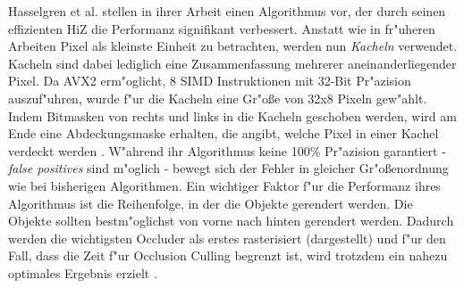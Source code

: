 \documentclass[journal]{vgtc}
\begin{document}
Hasselgren et al. \cite{MSOC} stellen in ihrer Arbeit einen Algorithmus vor, der durch seinen effizienten HiZ die Performanz signifikant verbessert. Anstatt wie in fr"uheren Arbeiten Pixel als kleinste Einheit zu betrachten, werden nun \textit{Kacheln} verwendet. Kacheln sind dabei lediglich eine Zusammenfassung mehrerer aneinanderliegender Pixel. Da AVX2 erm"oglicht, 8 SIMD Instruktionen mit 32-Bit Pr"azision auszuf"uhren, wurde f"ur die Kacheln eine Gr"o\ss{}e von 32x8 Pixeln gew"ahlt. Indem Bitmasken von rechts und links in die Kacheln geschoben werden, wird am Ende eine Abdeckungsmaske erhalten, die angibt, welche Pixel in einer Kachel verdeckt werden \cite{MSOC}.
W"ahrend ihr Algorithmus keine 100\% Pr"azision garantiert - \textit{false positives} sind m"oglich - bewegt sich der Fehler in gleicher Gr"o\ss{}enordnung wie bei bisherigen Algorithmen. Ein wichtiger Faktor f"ur die Performanz ihres Algorithmus ist die Reihenfolge, in der die Objekte gerendert werden. Die Objekte sollten bestm"oglichst von vorne nach hinten gerendert werden. Dadurch werden die wichtigsten Occluder als erstes rasterisiert (dargestellt) und f"ur den Fall, dass die Zeit f"ur Occlusion Culling begrenzt ist, wird trotzdem ein nahezu optimales Ergebnis erzielt \cite{MSOC}.
\end{document}
